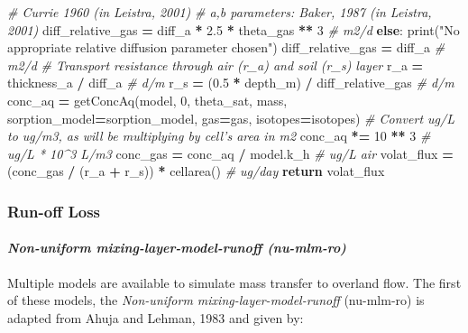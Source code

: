 \documentclass[]{article}
\newenvironment{Shaded}{\begin{snugshade}}{\end{snugshade}}
\newcommand{\DecValTok}[1]{\textcolor[rgb]{0.00,0.00,0.81}{#1}}
\newcommand{\FloatTok}[1]{\textcolor[rgb]{0.00,0.00,0.81}{#1}}
\newcommand{\StringTok}[1]{\textcolor[rgb]{0.31,0.60,0.02}{#1}}
\newcommand{\CommentTok}[1]{\textcolor[rgb]{0.56,0.35,0.01}{\textit{#1}}}
\newcommand{\ControlFlowTok}[1]{\textcolor[rgb]{0.13,0.29,0.53}{\textbf{#1}}}
\newcommand{\OperatorTok}[1]{\textcolor[rgb]{0.81,0.36,0.00}{\textbf{#1}}}
\newcommand{\BuiltInTok}[1]{#1}
\newcommand{\NormalTok}[1]{#1}
\let\oldparagraph\paragraph
\renewcommand{\paragraph}[1]{\oldparagraph{#1}\mbox{}}
\begin{document}
\begin{Shaded}
\begin{Highlighting}[]
        \CommentTok{# Currie 1960 (in Leistra, 2001)}
        \CommentTok{# a,b parameters: Baker, 1987 (in Leistra, 2001)}
\NormalTok{        diff_relative_gas }\OperatorTok{=}\NormalTok{ diff_a }\OperatorTok{*} \FloatTok{2.5} \OperatorTok{*}\NormalTok{ theta_gas }\OperatorTok{**} \DecValTok{3}  \CommentTok{# m2/d}
    \ControlFlowTok{else}\NormalTok{:}
        \BuiltInTok{print}\NormalTok{(}\StringTok{"No appropriate relative diffusion parameter chosen"}\NormalTok{)}
\NormalTok{        diff_relative_gas }\OperatorTok{=}\NormalTok{ diff_a  }\CommentTok{# m2/d}
    \CommentTok{# Transport resistance through air (r_a) and soil (r_s) layer}
\NormalTok{    r_a }\OperatorTok{=}\NormalTok{ thickness_a }\OperatorTok{/}\NormalTok{ diff_a  }\CommentTok{# d/m}
\NormalTok{    r_s }\OperatorTok{=}\NormalTok{ (}\FloatTok{0.5} \OperatorTok{*}\NormalTok{ depth_m) }\OperatorTok{/}\NormalTok{ diff_relative_gas  }\CommentTok{# d/m}
\NormalTok{    conc_aq }\OperatorTok{=}\NormalTok{ getConcAq(model, }\DecValTok{0}\NormalTok{, theta_sat, mass,}
\NormalTok{                        sorption_model}\OperatorTok{=}\NormalTok{sorption_model, gas}\OperatorTok{=}\NormalTok{gas, isotopes}\OperatorTok{=}\NormalTok{isotopes)}
    \CommentTok{# Convert ug/L to ug/m3, as will be multiplying by cell's area in m2}
\NormalTok{    conc_aq }\OperatorTok{*=} \DecValTok{10} \OperatorTok{**} \DecValTok{3}  \CommentTok{# ug/L * 10^3 L/m3}
\NormalTok{    conc_gas }\OperatorTok{=}\NormalTok{ conc_aq }\OperatorTok{/}\NormalTok{ model.k_h  }\CommentTok{# ug/L air}
\NormalTok{    volat_flux }\OperatorTok{=}\NormalTok{ (conc_gas }\OperatorTok{/}\NormalTok{ (r_a }\OperatorTok{+}\NormalTok{ r_s)) }\OperatorTok{*}\NormalTok{ cellarea()  }\CommentTok{# ug/day}
    \ControlFlowTok{return}\NormalTok{ volat_flux}
\end{Highlighting}
\end{Shaded}

\hypertarget{run-off-loss}{%
\subsubsection{Run-off Loss}\label{run-off-loss}}

\hypertarget{section}{%
\paragraph{\texorpdfstring{\textit{Non-uniform mixing-layer-model-runoff (nu-mlm-ro)}}{}}\label{section}}

Multiple models are available to simulate mass transfer to overland
flow. The first of these models, the
\textit{Non-uniform mixing-layer-model-runoff} (nu-mlm-ro) is adapted
from Ahuja and Lehman, 1983 \citep[see][eq. 1 and p.~1217]{Shi2011} and
given by:
\end{document}
